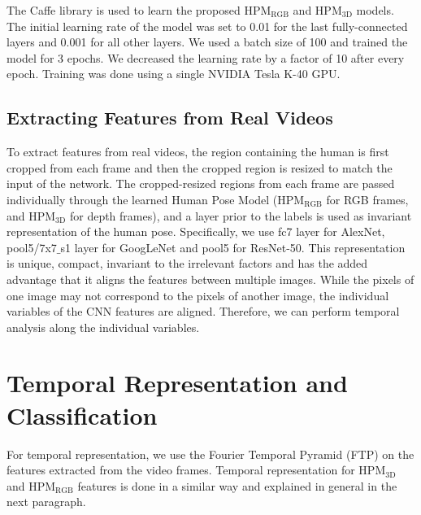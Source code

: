 \documentclass[twocolumn]{svjour3}          \smartqed  \usepackage{graphicx}
\begin{document}
The Caffe library \citep{jia2014caffe} is used to learn the proposed HPM$_{\mathrm{RGB}}$ and HPM$_{\mathrm{3D}}$ models. The initial learning rate of the model was set to 0.01 for the last fully-connected layers and 0.001 for all other layers. We used a batch size of 100 and trained the model for 3 epochs. We decreased the learning rate by a factor of 10 after every epoch. Training was done using a single NVIDIA Tesla K-40 GPU.

\subsection{Extracting Features from Real Videos}

To extract features from real videos, the region containing the human is first cropped from each frame and then the cropped region is resized to match the input of the network. The cropped-resized regions from each frame are passed individually through the learned Human Pose Model (HPM$_{\mathrm{RGB}}$ for RGB frames, and HPM$_{\mathrm{3D}}$ for depth frames), and a layer prior to the labels is used as invariant representation of the human pose. Specifically, we use fc7 layer for AlexNet, pool5/7x7$\_$s1 layer for GoogLeNet and pool5 for ResNet-50. This representation is unique, compact, invariant to the irrelevant factors and  has the added advantage that it aligns the features between multiple images. While the pixels of one image may not correspond to the pixels of another image, the individual variables of the CNN features are aligned. Therefore, we can perform temporal analysis along the individual variables.

\section{Temporal Representation and Classification}
For temporal representation, we use the Fourier Temporal Pyramid (FTP) \citep{wang2013learning} on the features extracted from the video frames. Temporal representation for HPM$_{\mathrm{3D}}$ and HPM$_{\mathrm{RGB}}$ features is done in a similar way and explained in general in the next paragraph.
\end{document}
